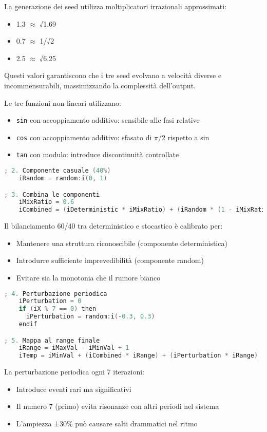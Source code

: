 La generazione dei seed utilizza moltiplicatori irrazionali approssimati:
\begin{itemize}
    \item 1.3 $\approx$ √1.69 
    \item 0.7 $\approx$ 1/√2
    \item 2.5 $\approx$ √6.25
\end{itemize}

Questi valori garantiscono che i tre seed evolvano a velocità diverse e incommensurabili, massimizzando la complessità dell'output.

Le tre funzioni non lineari utilizzano:
\begin{itemize}
    \item \texttt{sin} con accoppiamento additivo: sensibile alle fasi relative
    \item \texttt{cos} con accoppiamento additivo: sfasato di $\pi$/2 rispetto a sin
    \item \texttt{tan} con modulo: introduce discontinuità controllate
\end{itemize}

\begin{lstlisting}[language=C]
    ; 2. Componente casuale (40%)
    iRandom = random:i(0, 1)

; 3. Combina le componenti
    iMixRatio = 0.6
    iCombined = (iDeterministic * iMixRatio) + (iRandom * (1 - iMixRatio))
\end{lstlisting}

Il bilanciamento 60/40 tra deterministico e stocastico è calibrato per:
\begin{itemize}
    \item Mantenere una struttura riconoscibile (componente deterministica)
    \item Introdurre sufficiente imprevedibilità (componente random)
    \item Evitare sia la monotonia che il rumore bianco
\end{itemize}

\begin{lstlisting}[language=C]
    ; 4. Perturbazione periodica
    iPerturbation = 0
    if (iX % 7 == 0) then 
      iPerturbation = random:i(-0.3, 0.3)
    endif

; 5. Mappa al range finale
    iRange = iMaxVal - iMinVal + 1
    iTemp = iMinVal + (iCombined * iRange) + (iPerturbation * iRange)
\end{lstlisting}

La perturbazione periodica ogni 7 iterazioni:
\begin{itemize}
    \item Introduce eventi rari ma significativi
    \item Il numero 7 (primo) evita risonanze con altri periodi nel sistema
    \item L'ampiezza ±30\% può causare salti drammatici nel ritmo
\end{itemize}
